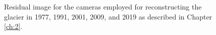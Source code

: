 \begin{figure}[hb]
{  } \qquad
   \\ \vspace{2mm}
   \\  
  \caption[]{Residual image for the cameras employed for reconstructing the glacier in 1977, 1991, 2001, 2009, and 2019 as described in Chapter \ref{ch:2}.}
  \label{fig:app:camera_residuals_histo}
\end{figure}


